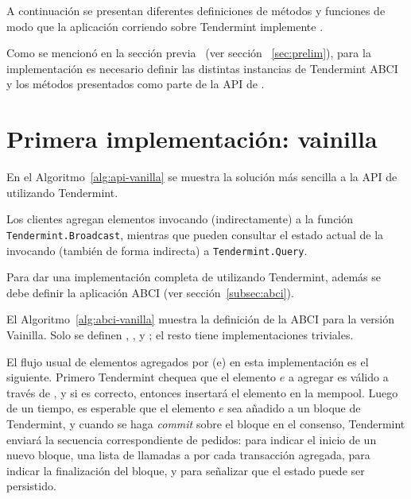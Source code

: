 %
A continuación se presentan diferentes definiciones de métodos y funciones de
modo que la aplicación corriendo sobre Tendermint implemente \setchain.

%
Como se mencionó en la sección previa ~(ver sección ~\ref{sec:prelim}), para la
implementación es necesario definir las distintas instancias de Tendermint ABCI
y los métodos presentados como parte de la API de \setchain.

\section{Primera implementación: vainilla}\label{sec:vanilla}


%
En el Algoritmo~\ref{alg:api-vanilla} se muestra la solución más sencilla a la API
de \setchain utilizando Tendermint.
%

Los clientes agregan elementos invocando (indirectamente) a la función
\texttt{Tendermint.Broadcast}, mientras que pueden consultar el estado actual de
la \setchain invocando (también de forma indirecta) a \texttt{Tendermint.Query}.
%

Para dar una implementación completa de \setchain utilizando Tendermint, además se
debe definir la aplicación ABCI (ver sección~\ref{subsec:abci}). 
%

El Algoritmo~\ref{alg:abci-vanilla} muestra la definición de la ABCI para la versión
Vainilla.
%
Solo se definen \CheckTx, \DeliverTx, y \EndBlock; el resto tiene implementaciones
triviales.

%
El flujo usual de elementos agregados por \Add(e) en esta implementación es el siguiente.
%
Primero Tendermint chequea que el elemento $e$ a agregar es válido a través de
\CheckTx, y si es correcto, entonces insertará el elemento en la mempool.
%
Luego de un tiempo, es esperable que el elemento $e$ sea añadido a un bloque de Tendermint,
y cuando se haga \textit{commit} sobre el bloque en el consenso, Tendermint enviará
la secuencia correspondiente de pedidos: \BeginBlock para indicar el inicio de un nuevo bloque,
una lista de llamadas a \DeliverTx por cada transacción agregada, \EndBlock para indicar la
finalización del bloque, y \Commit para señalizar que el estado puede ser persistido.




